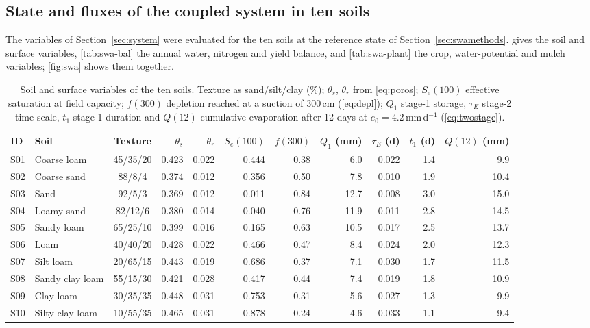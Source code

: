 \subsection{State and fluxes of the coupled system in ten soils}
\label{sec:swa}
The variables of Section~\ref{sec:system} were evaluated for the ten soils at the reference state of Section~\ref{sec:swamethods}.  gives the soil and surface variables, \cref{tab:swa-bal} the annual water, nitrogen and yield balance, and \cref{tab:swa-plant} the crop, water-potential and mulch variables; \cref{fig:swa} shows them together.

\begin{table}[H]\centering\small
\caption{Soil and surface variables of the ten soils. Texture as sand/silt/clay (\%); $\theta_s$, $\theta_r$ from \cref{eq:poros}; $S_e(100)$ effective saturation at field capacity; $f(300)$ depletion reached at a suction of 300\,cm (\cref{eq:depl}); $Q_1$ stage-1 storage, $\tau_E$ stage-2 time scale, $t_1$ stage-1 duration and $Q(12)$ cumulative evaporation after 12 days at $e_0=4.2$\,mm\,d$^{-1}$ (\cref{eq:twostage}).}
\label{tab:swa-hyd}
\setlength{\tabcolsep}{3pt}\footnotesize
\begin{tabular}{llcrrrrrrrr}
\toprule
ID & Soil & Texture & $\theta_s$ & $\theta_r$ & $S_e(100)$ & $f(300)$ & $Q_1$ (mm) & $\tau_E$ (d) & $t_1$ (d) & $Q(12)$ (mm)\\\midrule
S01 & Coarse loam & 45/35/20 & 0.423 & 0.022 & 0.444 & 0.38 & 6.0 & 0.022 & 1.4 & 9.9\\
S02 & Coarse sand & 88/8/4 & 0.374 & 0.012 & 0.356 & 0.50 & 7.8 & 0.010 & 1.9 & 10.4\\
S03 & Sand & 92/5/3 & 0.369 & 0.012 & 0.011 & 0.84 & 12.7 & 0.008 & 3.0 & 15.0\\
S04 & Loamy sand & 82/12/6 & 0.380 & 0.014 & 0.040 & 0.76 & 11.9 & 0.011 & 2.8 & 14.5\\
S05 & Sandy loam & 65/25/10 & 0.399 & 0.016 & 0.165 & 0.63 & 10.5 & 0.017 & 2.5 & 13.7\\
S06 & Loam & 40/40/20 & 0.428 & 0.022 & 0.466 & 0.47 & 8.4 & 0.024 & 2.0 & 12.3\\
S07 & Silt loam & 20/65/15 & 0.443 & 0.019 & 0.686 & 0.37 & 7.1 & 0.030 & 1.7 & 11.5\\
S08 & Sandy clay loam & 55/15/30 & 0.421 & 0.028 & 0.417 & 0.44 & 7.4 & 0.019 & 1.8 & 10.9\\
S09 & Clay loam & 30/35/35 & 0.448 & 0.031 & 0.753 & 0.31 & 5.6 & 0.027 & 1.3 & 9.9\\
S10 & Silty clay loam & 10/55/35 & 0.465 & 0.031 & 0.878 & 0.24 & 4.6 & 0.033 & 1.1 & 9.4\\\bottomrule
\end{tabular}
\end{table}

